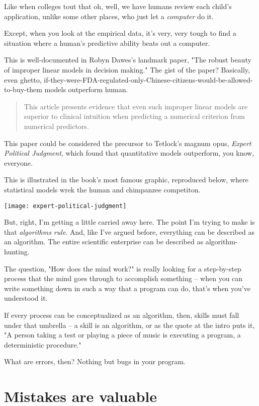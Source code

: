 Like when colleges tout that oh, well, we have humans review each child's
application, unlike some other places, who just let a \textit{computer} do
it.

Except, when you look at the empirical data, it's very, very tough to find a
situation where a human's predictive ability beats out a computer. 

This is well-documented in Robyn Dawes's landmark paper, "The robust beauty of
improper linear models in decision making." The gist of the paper? Basically,
even ghetto,
if-they-were-FDA-regulated-only-Chinese-citizens-would-be-allowed-to-buy-them
models outperform human.

\begin{quote}
This article presents evidence that even such improper linear models are
superior to clinical intuition when predicting a numerical criterion from
numerical predictors. 
\end{quote}

This paper could be considered the precursor to Tetlock's magnum opus, \textit{Expert
Political Judgment}, which found that quantitative models outperform, you know,
everyone.

This is illustrated in the book's most famous graphic, reproduced below, where
statistical models wrek the human and chimpanzee competiton.

\texttt{[image: expert-political-judgment]}

But, right, I'm getting a little carried away here. The point I'm trying to make
is that \textit{algorithms rule}. And, like I've argued before, everything can be
described as an algorithm. The entire scientific enterprise can be described as
algorithm-hunting.

The question, "How does the mind work?" is really looking for a step-by-step
process that the mind goes through to accomplish something -- when you can write
something down in such a way that a program can do, that's when you've
understood it.

If every process can be conceptualized as an algorithm, then, skills must fall
under that umbrella -- a skill is an algorithm, or as the quote at the intro
puts it, "A person taking a test or playing a piece of music is executing a
program, a deterministic procedure."

What are errors, then? Nothing but bugs in your program.

\section{Mistakes are valuable}

